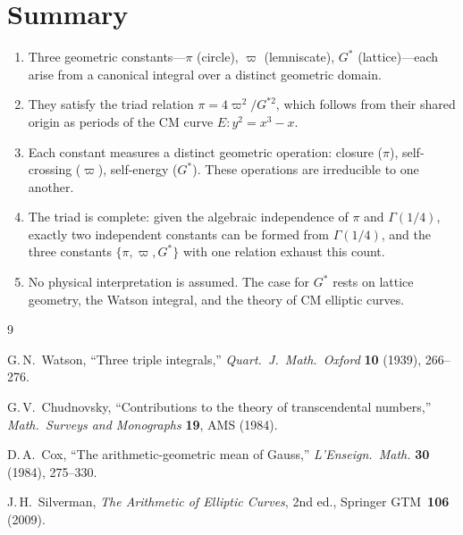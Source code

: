 \documentclass[12pt]{article}
\theoremstyle{definition}
\theoremstyle{remark}
\begin{document}
\section{Summary}

\begin{enumerate}
    \item Three geometric constants---$\pi$ (circle), $\varpi$ (lemniscate), $G^*$ (lattice)---each arise from a canonical integral over a distinct geometric domain.

    \item They satisfy the triad relation $\pi = 4\varpi^2/G^{*2}$, which follows from their shared origin as periods of the CM curve $E\!: y^2 = x^3 - x$.

    \item Each constant measures a distinct geometric operation: closure ($\pi$), self-crossing ($\varpi$), self-energy ($G^*$). These operations are irreducible to one another.

    \item The triad is complete: given the algebraic independence of $\pi$ and $\Gamma(1/4)$, exactly two independent constants can be formed from $\Gamma(1/4)$, and the three constants $\{\pi, \varpi, G^*\}$ with one relation exhaust this count.

    \item No physical interpretation is assumed. The case for $G^*$ rests on lattice geometry, the Watson integral, and the theory of CM elliptic curves.
\end{enumerate}

\begin{thebibliography}{9}

G.\,N.\ Watson, ``Three triple integrals,'' \textit{Quart.\ J.\ Math.\ Oxford} \textbf{10} (1939), 266--276.

G.\,V.\ Chudnovsky, ``Contributions to the theory of transcendental numbers,'' \textit{Math.\ Surveys and Monographs} \textbf{19}, AMS (1984).

D.\,A.\ Cox, ``The arithmetic-geometric mean of Gauss,'' \textit{L'Enseign.\ Math.} \textbf{30} (1984), 275--330.

J.\,H.\ Silverman, \textit{The Arithmetic of Elliptic Curves}, 2nd ed., Springer GTM~\textbf{106} (2009).

\end{thebibliography}
\end{document}
